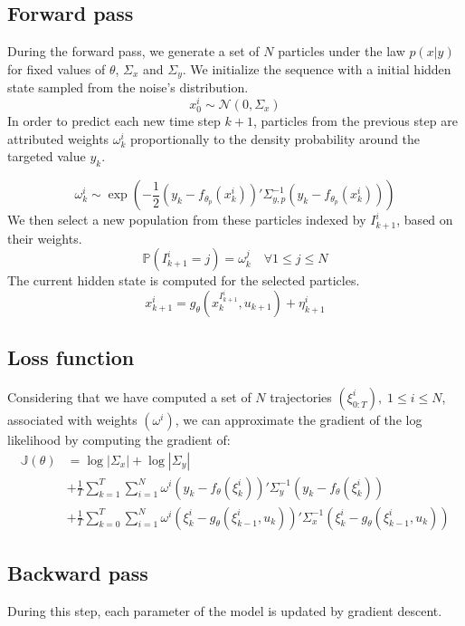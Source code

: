 \documentclass[10pt,a4paper]{report}
\begin{document}
\subsection{Forward pass}
During the forward pass, we generate a set of $N$ particles under the law $p(x|y)$ for fixed values of $\theta$, $\Sigma_x$ and $\Sigma_y$.
We initialize the sequence with a initial hidden state sampled from the noise's distribution.
$$
        x^i_0 \sim \mathcal{N}(0, \Sigma_x)
$$
In order to predict each new time step $k+1$, particles from the previous step are attributed weights $\omega_k^i$ proportionally to the density probability around the targeted value $y_k$.

$$\omega_k^i \sim \exp(-\frac{1}{2}(y_k - f_{\theta_p}(x_k^i))'\Sigma^{-1}_{y, p}(y_k - f_{\theta_p}(x_k^i)))$$
We then select a new population from these particles indexed by $I_{k+1}^i$, based on their weights.
$$\mathbb{P}(I_{k+1}^i=j) = \omega_k^j \quad \forall 1 \leq j \leq N$$
The current hidden state is computed for the selected particles.
$$x^i_{k+1} = g_\theta(x_k^{I_{k+1}^i}, u_{k+1}) + \eta^i_{k+1}$$

\subsection{Loss function}
Considering that we have computed a set of $N$ trajectories $(\xi^i_{0:T}),\;1 \leq i \leq N$, associated with weights $(\omega^i)$, we can approximate the gradient of the log likelihood by computing the gradient of:
\begin{align*}
        \mathbb{J}(\theta) & = \log |\Sigma_x| + \log |\Sigma_y|                                                                                                        \\
                           & + \frac{1}{T}\sum_{k=1}^T \sum_{i=1}^N \omega^i (y_k - f_\theta(\xi_k^i))' \Sigma_y^{-1} (y_k - f_\theta(\xi_k^i))                         \\
                           & + \frac{1}{T}\sum_{k=0}^T \sum_{i=1}^N \omega^i (\xi_k^i - g_\theta(\xi_{k-1}^i, u_k))'\Sigma_x^{-1}(\xi_k^i - g_\theta(\xi_{k-1}^i, u_k))
\end{align*}

\subsection{Backward pass}
During this step, each parameter of the model is updated by gradient descent.
\end{document}

